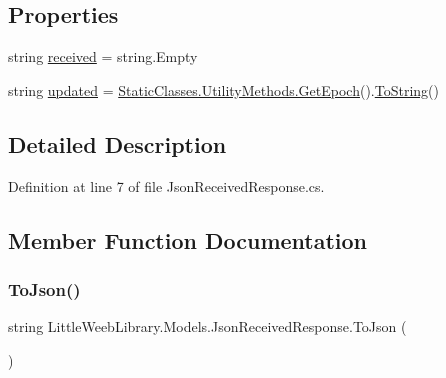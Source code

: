 \subsection*{Properties}
\begin{DoxyCompactItemize}
\item 
string \mbox{\hyperlink{class_little_weeb_library_1_1_models_1_1_json_received_response_a91b2c3461ca7bf54c108e0942ef48c25}{received}} = string.\+Empty
\item 
string \mbox{\hyperlink{class_little_weeb_library_1_1_models_1_1_json_received_response_aab698f610c341ad6a13f891262331683}{updated}} = \mbox{\hyperlink{class_little_weeb_library_1_1_static_classes_1_1_utility_methods_a12336d9e64983ddabaad8950486fafb2}{Static\+Classes.\+Utility\+Methods.\+Get\+Epoch}}().\mbox{\hyperlink{class_little_weeb_library_1_1_models_1_1_json_received_response_a396aa50a773bcd751e23cc7d61db34be}{To\+String}}()
\end{DoxyCompactItemize}


\subsection{Detailed Description}


Definition at line 7 of file Json\+Received\+Response.\+cs.



\subsection{Member Function Documentation}
\mbox{\label{class_little_weeb_library_1_1_models_1_1_json_received_response_abed77a236608efb9bf777a44e6d2361b}} 
\subsubsection{\texorpdfstring{To\+Json()}{ToJson()}}
{\footnotesize\ttfamily string Little\+Weeb\+Library.\+Models.\+Json\+Received\+Response.\+To\+Json (\begin{DoxyParamCaption}{ }\end{DoxyParamCaption})}



